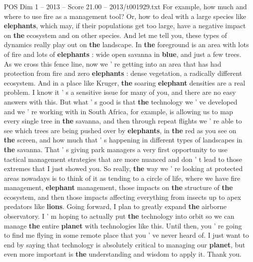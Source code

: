 \begin{textsample}{POS Dim 1 – 2013 – Score 21.00 – 2013/t001929.txt}
For example, how much and where to use fire as a management tool?
Or, how to deal with a large species like \textbf{elephants}, which may, if their populations get too large, have a negative impact on \textbf{the} ecosystem and on other species.
And let me tell you, these types of dynamics really play out on \textbf{the} landscape.
In \textbf{the} foreground is an area with lots of fire and lots of \textbf{elephants} : wide open savanna in \textbf{blue}, and just a few trees.
As we cross this fence line, now we ' re getting into an area that has had protection from fire and zero \textbf{elephants} : dense vegetation, a radically different ecosystem.
And in a place like Kruger, \textbf{the} soaring \textbf{elephant} densities are a real problem.
I know it ' s a sensitive issue for many of you, and there are no easy answers with this.
But what ' s good is that \textbf{the} technology we ' ve developed and we ' re working with in South Africa, for example, is allowing us to map every single tree in \textbf{the} savanna, and then through repeat flights we ' re able to see which trees are being pushed over by \textbf{elephants}, in \textbf{the} red as you see on \textbf{the} screen, and how much that ' s happening in different types of landscapes in \textbf{the} savanna.
That ' s giving park managers a very first opportunity to use tactical management strategies that are more nuanced and don ' t lead to those extremes that I just showed you.
So really, \textbf{the} way we ' re looking at protected areas nowadays is to think of it as tending to a circle of life, where we have fire management, \textbf{elephant} management, those impacts on \textbf{the} structure of \textbf{the} ecosystem, and then those impacts affecting everything from insects up to apex predators like \textbf{lions}.
Going forward, I plan to greatly expand \textbf{the} airborne observatory.
I ' m hoping to actually put \textbf{the} technology into orbit so we can manage \textbf{the} entire \textbf{planet} with technologies like this.
Until then, you ' re going to find me flying in some remote place that you ' ve never heard of.
I just want to end by saying that technology is absolutely critical to managing our \textbf{planet}, but even more important is \textbf{the} understanding and wisdom to apply it.
Thank you.

\end{textsample}
